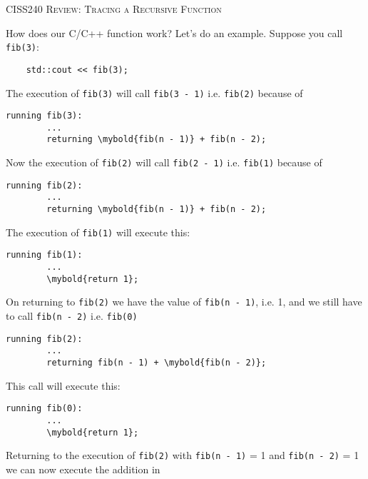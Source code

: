 \textsc{CISS240 Review: Tracing a Recursive Function}

How does our C/C++ function work? Let's do an example. Suppose you call \verb!fib(3)!:

\verb!    std::cout << fib(3);!

The execution of \verb!fib(3)! will call \verb!fib(3 - 1)! i.e. \verb!fib(2)! because of

\begin{Verbatim}[frame=single, commandchars=\\\{\}]
    running fib(3):
        ...
        returning \mybold{fib(n - 1)} + fib(n - 2);
\end{Verbatim}

Now the execution of \verb!fib(2)! will call \verb!fib(2 - 1)! i.e. \verb!fib(1)! because of

\begin{Verbatim}[frame=single, commandchars=\\\{\}]
    running fib(2):
        ...
        returning \mybold{fib(n - 1)} + fib(n - 2);
\end{Verbatim}

The execution of \verb!fib(1)! will execute this:

\begin{Verbatim}[frame=single, commandchars=\\\{\}]
    running fib(1):
        ...
        \mybold{return 1};
\end{Verbatim}

On returning to \verb!fib(2)! we have the value of \verb!fib(n - 1)!, i.e. 1, and we still
have to call \verb!fib(n - 2)! i.e. \verb!fib(0)!

\begin{Verbatim}[frame=single, commandchars=\\\{\}]
    running fib(2):
        ...
        returning fib(n - 1) + \mybold{fib(n - 2)};
\end{Verbatim}

This call will execute this:

\begin{Verbatim}[frame=single, commandchars=\\\{\}]
    running fib(0):
        ...
        \mybold{return 1};
\end{Verbatim}



\newpage
Returning to the execution of \verb!fib(2)! with \verb!fib(n - 1)! = 1 and \verb!fib(n - 2)! = 1
we can now execute the addition in


